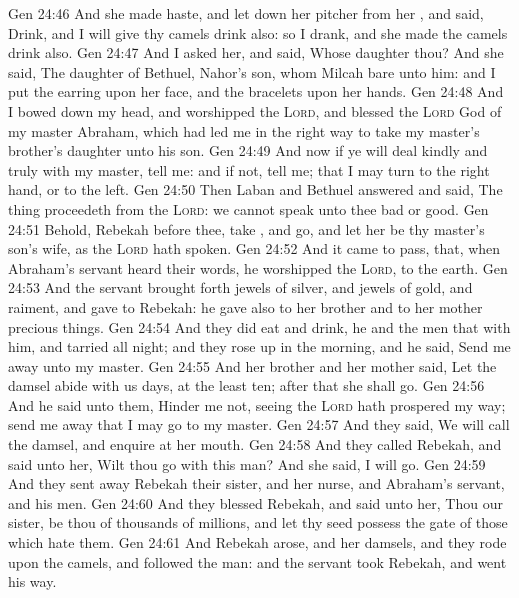 \vs Gen 24:46 And she made haste, and let down her pitcher from her , and said, Drink, and I will give thy camels drink also: so I drank, and she made the camels drink also.
\vs Gen 24:47 And I asked her, and said, Whose daughter  thou? And she said, The daughter of Bethuel, Nahor's son, whom Milcah bare unto him: and I put the earring upon her face, and the bracelets upon her hands.
\vs Gen 24:48 And I bowed down my head, and worshipped the \textsc{Lord}, and blessed the \textsc{Lord} God of my master Abraham, which had led me in the right way to take my master's brother's daughter unto his son.
\vs Gen 24:49 And now if ye will deal kindly and truly with my master, tell me: and if not, tell me; that I may turn to the right hand, or to the left.
\vs Gen 24:50 Then Laban and Bethuel answered and said, The thing proceedeth from the \textsc{Lord}: we cannot speak unto thee bad or good.
\vs Gen 24:51 Behold, Rebekah  before thee, take , and go, and let her be thy master's son's wife, as the \textsc{Lord} hath spoken.
\vs Gen 24:52 And it came to pass, that, when Abraham's servant heard their words, he worshipped the \textsc{Lord},  to the earth.
\vs Gen 24:53 And the servant brought forth jewels of silver, and jewels of gold, and raiment, and gave  to Rebekah: he gave also to her brother and to her mother precious things.
\vs Gen 24:54 And they did eat and drink, he and the men that  with him, and tarried all night; and they rose up in the morning, and he said, Send me away unto my master.
\vs Gen 24:55 And her brother and her mother said, Let the damsel abide with us  days, at the least ten; after that she shall go.
\vs Gen 24:56 And he said unto them, Hinder me not, seeing the \textsc{Lord} hath prospered my way; send me away that I may go to my master.
\vs Gen 24:57 And they said, We will call the damsel, and enquire at her mouth.
\vs Gen 24:58 And they called Rebekah, and said unto her, Wilt thou go with this man? And she said, I will go.
\vs Gen 24:59 And they sent away Rebekah their sister, and her nurse, and Abraham's servant, and his men.
\vs Gen 24:60 And they blessed Rebekah, and said unto her, Thou  our sister, be thou  of thousands of millions, and let thy seed possess the gate of those which hate them.
\vs Gen 24:61 And Rebekah arose, and her damsels, and they rode upon the camels, and followed the man: and the servant took Rebekah, and went his way.
